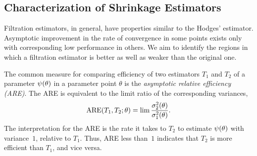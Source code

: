 \documentclass[ejs, twoside]{imsart}
\theoremstyle{plain}
\theoremstyle{remark}
\newcommand{\fullstop}{\text{.}}
\newcommand{\iid}{i.i.d.}
\numberwithin{equation}{section}
\numberwithin{table}{section}
\numberwithin{figure}{section}
\let\originalleft\left
\let\originalright\right
\renewcommand{\left}{\mathopen{}\mathclose\bgroup\originalleft}
\renewcommand{\right}{\aftergroup\egroup\originalright}
\begin{document}








\subsection{Characterization of Shrinkage Estimators} \label{sec:la-char}
Filtration estimators, in general, have properties similar to the Hodges' estimator. Asymptotic improvement in the rate of convergence in some points exists only with corresponding low performance in others. We aim to identify the regions in which a filtration estimator is better as well as weaker than the original one.


	The common measure for comparing efficiency of two estimators \(T_1\) and \(T_2\) of a parameter \(\psi\left(\theta \right) \) in a parameter point \(\theta\) is the \emph{asymptotic relative efficiency (ARE)}. The ARE is equivalent to the limit ratio of the corresponding variances,
	\[\operatorname{ARE}\left(T_1, T_2 ; \theta \right) = \lim \frac{\sigma_2^2\left(\theta\right)}{\sigma_1^2\left(\theta\right)} \fullstop\]
	The interpretation for the ARE is the rate it takes to \(T_2\) to estimate \(\psi\left(\theta \right) \) with variance~\(1\), relative to \(T_1\). Thus, ARE less than~\(1\) indicates that \(T_2\) is more efficient than \(T_1\), and vice versa.
	
\end{document}
